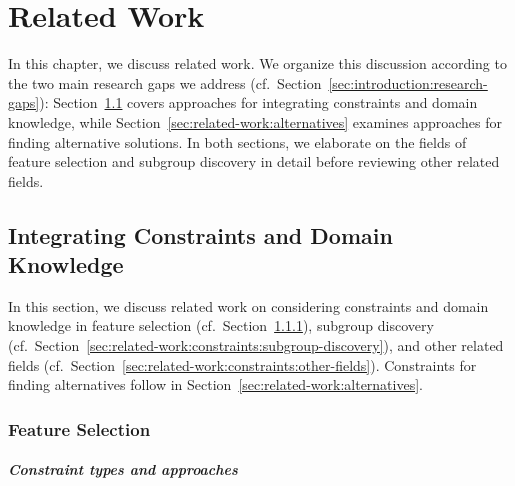 \chapter{Related Work}
\label{sec:related-work}

In this chapter, we discuss related work.
We organize this discussion according to the two main research gaps we address (cf.~Section~\ref{sec:introduction:research-gaps}):
Section~\ref{sec:related-work:constraints} covers approaches for integrating constraints and domain knowledge, while Section~\ref{sec:related-work:alternatives} examines approaches for finding alternative solutions.
In both sections, we elaborate on the fields of feature selection and subgroup discovery in detail before reviewing other related fields.

\section{Integrating Constraints and Domain Knowledge}
\label{sec:related-work:constraints}

In this section, we discuss related work on considering constraints and domain knowledge in feature selection
(cf.~Section~\ref{sec:related-work:constraints:feature-selection}), subgroup discovery
(cf.~Section~\ref{sec:related-work:constraints:subgroup-discovery}), and other related fields
(cf.~Section~\ref{sec:related-work:constraints:other-fields}).
Constraints for finding alternatives follow in Section~\ref{sec:related-work:alternatives}.

\subsection{Feature Selection}
\label{sec:related-work:constraints:feature-selection}

\paragraph{Constraint types and approaches}

